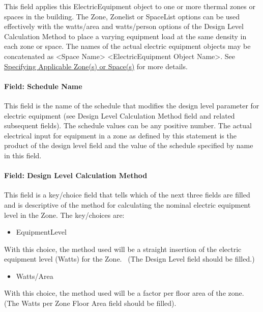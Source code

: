 This field applies this ElectricEquipment object to one or more thermal zones or spaces in the building. The Zone, Zonelist or SpaceList options can be used effectively with the watts/area and watts/person options of the Design Level Calculation Method to place a varying equipment load at the same density in each zone or space. The names of the actual electric equipment objects may be concatenated as \textless{}Space Name\textgreater{} \textless{}ElectricEquipment Object Name\textgreater{}. See \hyperref[specifying-applicable-zones-or-spaces]{Specifying Applicable Zone(s) or Space(s)} for more details.

\paragraph{Field: Schedule Name}\label{field-schedule-name-1-001}

This field is the name of the schedule that modifies the design level parameter for electric equipment (see Design Level Calculation Method field and related subsequent fields). The schedule values can be any positive number. The actual electrical input for equipment in a zone as defined by this statement is the product of the design level field and the value of the schedule specified by name in this field.

\paragraph{Field: Design Level Calculation Method}\label{field-design-level-calculation-method-1}

This field is a key/choice field that tells which of the next three fields are filled and is descriptive of the method for calculating the nominal electric equipment level in the Zone. The key/choices are:

\begin{itemize}
\tightlist
\item
  EquipmentLevel
\end{itemize}

With this choice, the method used will be a straight insertion of the electric equipment level (Watts) for the Zone.~ (The Design Level field should be filled.)

\begin{itemize}
\tightlist
\item
  Watts/Area
\end{itemize}

With this choice, the method used will be a factor per floor area of the zone. (The Watts per Zone Floor Area field should be filled).

